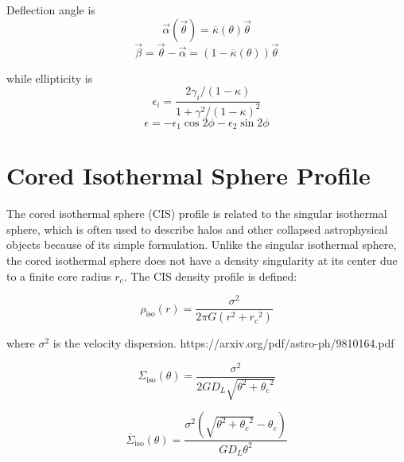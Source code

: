 \documentclass[10pt]{article}
\begin{document}
Deflection angle is
\begin{equation}
\vec{\alpha}(\vec{\theta}) = \overline{\kappa}(\theta)\vec{\theta}
\end{equation}
\begin{equation}
\vec{\beta} = \vec{\theta} - \vec{\alpha} = (1 - \overline{\kappa}(\theta))\vec{\theta}
\end{equation}

while ellipticity is
\begin{equation}
\epsilon_i = \frac{2 \gamma_i/(1 - \kappa)}{1 + \gamma^2/(1 - \kappa)^2}
\end{equation}
\begin{equation}
\epsilon =  -\epsilon_1 \cos{2\phi} -\epsilon_2 \sin{2\phi}
\end{equation}



\section{Cored Isothermal Sphere Profile}
The cored isothermal sphere (CIS) profile is related to the singular isothermal sphere, which is often used to describe halos and other collapsed astrophysical objects because of its simple formulation. Unlike the singular isothermal sphere, the cored isothermal sphere does not have a density singularity at its center due to a finite core radius $r_c$. The CIS density profile is defined:

\begin{equation}
\rho_\mathrm{iso}(r) = \frac{\sigma^2}{2\pi G (r^2 + {r_c}^2)}
\end{equation}

where $\sigma^2$ is the velocity dispersion.
https://arxiv.org/pdf/astro-ph/9810164.pdf
%
%

\begin{equation}
\Sigma_\mathrm{iso}(\theta) = \frac{\sigma^2}{2 G D_L \sqrt{\theta^2 + {\theta_c}^2}}
\end{equation}

\begin{equation}
\overline{\Sigma}_\mathrm{iso}(\theta) = \frac{\sigma^2 \left(\sqrt{\theta^2 + {\theta_c}^2} - \theta_c \right)}{G D_L \theta^2}
\end{equation}
\end{document}
